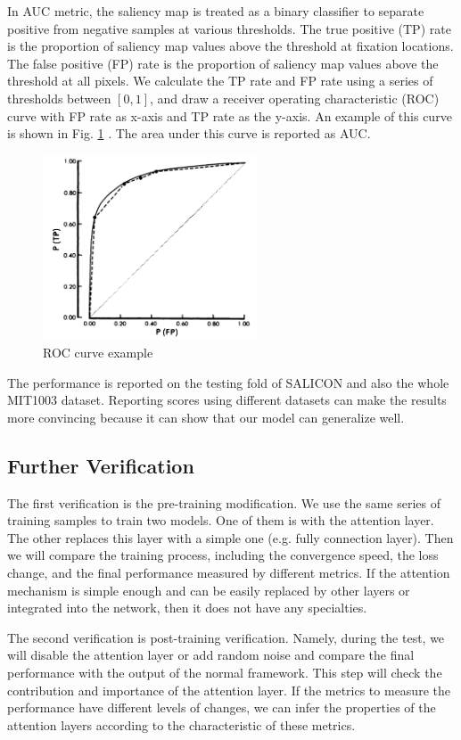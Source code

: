 \documentclass[12pt]{article}
\begin{document}
In AUC metric,
the saliency map is treated as a binary classifier to separate positive from negative samples at various thresholds. 
The true positive (TP) rate is the proportion of saliency map values above the threshold at fixation locations.
The false positive (FP) rate is the proportion of saliency map values above the threshold at all pixels.
We calculate the TP rate and FP rate using a series of thresholds between $[0, 1]$, and draw a
receiver operating characteristic (ROC) curve with FP rate as x-axis and TP rate as the y-axis.
An example of this curve is shown in Fig. \ref{img:AUC} \cite{hanleyMeaningUseArea1982}.
The area under this curve is reported as AUC.
\begin{figure}[!h]
    \centering
    \includegraphics[width=2.5in]{imgs/AUC.png}
    \caption{ROC curve example}
    \label{img:AUC}
\end{figure}


The performance is reported on the testing fold of SALICON and also the whole MIT1003 dataset.
Reporting scores using different datasets can make the results more convincing
because it can show that our model can generalize well.

\subsection{Further Verification}

The first verification is the pre-training modification. We use the same series of training samples to train two models. One of them is with the attention layer. The other replaces this layer with a simple one (e.g. fully connection layer). Then we will compare the training process, including the convergence speed, the loss change, and the final performance measured by different metrics. If the attention mechanism is simple enough and can be easily replaced by other layers or integrated into the network, then it does not have any specialties.

The second verification is post-training verification. Namely, during the test, we will disable the attention layer or add random noise and compare the final performance with the output of the normal framework. This step will check the contribution and importance of the attention layer. If the metrics to measure the performance have different levels of changes, we can infer the properties of the attention layers according to the characteristic of these metrics.
\end{document}
